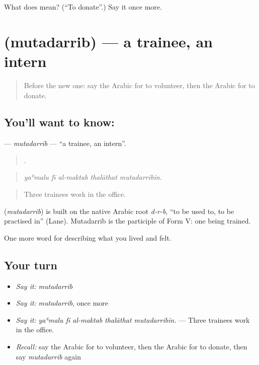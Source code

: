\begin{tcolorbox}[breakable,colback=teal!4,colframe=teal!35!black,title={Before you move on}]
What does  mean? (\textquotedblleft{}To donate\textquotedblright{}.) Say it once more.
\end{tcolorbox}
\section[\texorpdfstring{\ar{متدرب} (mutadarrib)}{متدرب (mutadarrib)}]{ (mutadarrib) — a trainee, an intern}

\label{lesson:AR-C519-mutadarrib}



\begin{quote}
Before the new one: say the Arabic for to volunteer, then the Arabic for to donate.
\end{quote}

\subsection*{You'll want to know: }
\textbf{} — \emph{mutadarrib} — \textquotedblleft{}a trainee, an intern\textquotedblright{}.

\begin{quote}
    .
\end{quote}

\begin{quote}
\emph{yaʿmalu fī al-maktab thalāthat mutadarribīn.}
\end{quote}

\begin{quote}
Three trainees work in the office.
\end{quote}

\begin{cousinweb}
\textbf{} (\emph{mutadarrib}) is built on the native Arabic root \emph{d-r-b}, \textquotedblleft{}to be used to, to be practised in\textquotedblright{} (Lane). Mutadarrib is the participle of Form V: one being trained.
\end{cousinweb}

\begin{grammarlens}[title={What you've built}]
One more word for describing what you lived and felt.
\end{grammarlens}

\subsection*{Your turn}
\begin{itemize}
\raggedright
  \item \emph{Say it:} \emph{mutadarrib}
  \item \emph{Say it:} \emph{mutadarrib}, once more
  \item \emph{Say it:} \emph{yaʿmalu fī al-maktab thalāthat mutadarribīn.} — Three trainees work in the office.
  \item \emph{Recall:} say the Arabic for to volunteer, then the Arabic for to donate, then say \emph{mutadarrib} again
\end{itemize}

